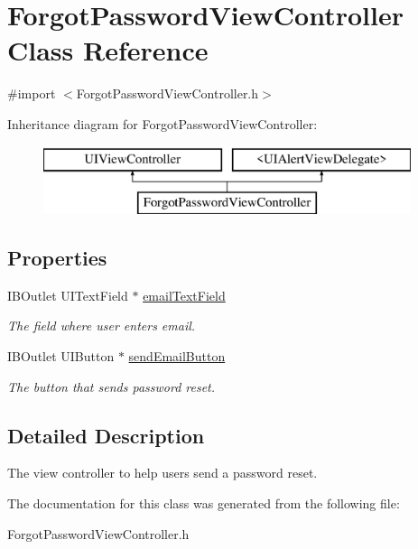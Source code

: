 \hypertarget{interface_forgot_password_view_controller}{\section{Forgot\+Password\+View\+Controller Class Reference}
\label{interface_forgot_password_view_controller}
}


{\ttfamily \#import $<$Forgot\+Password\+View\+Controller.\+h$>$}

Inheritance diagram for Forgot\+Password\+View\+Controller\+:\begin{figure}[H]
\begin{center}
\leavevmode
\includegraphics[height=2.000000cm]{interface_forgot_password_view_controller}
\end{center}
\end{figure}
\subsection*{Properties}
\begin{DoxyCompactItemize}
\item 
\hypertarget{interface_forgot_password_view_controller_a2027b91c7f7d7c18817fb441f41686ef}{I\+B\+Outlet U\+I\+Text\+Field $\ast$ \hyperlink{interface_forgot_password_view_controller_a2027b91c7f7d7c18817fb441f41686ef}{email\+Text\+Field}}\label{interface_forgot_password_view_controller_a2027b91c7f7d7c18817fb441f41686ef}

\begin{DoxyCompactList}\small\item\em The field where user enters email. \end{DoxyCompactList}\item 
\hypertarget{interface_forgot_password_view_controller_a935d59e7247b5f17d578a2c3cc27a318}{I\+B\+Outlet U\+I\+Button $\ast$ \hyperlink{interface_forgot_password_view_controller_a935d59e7247b5f17d578a2c3cc27a318}{send\+Email\+Button}}\label{interface_forgot_password_view_controller_a935d59e7247b5f17d578a2c3cc27a318}

\begin{DoxyCompactList}\small\item\em The button that sends password reset. \end{DoxyCompactList}\end{DoxyCompactItemize}


\subsection{Detailed Description}
The view controller to help users send a password reset. 

The documentation for this class was generated from the following file\+:\begin{DoxyCompactItemize}
\item 
Forgot\+Password\+View\+Controller.\+h\end{DoxyCompactItemize}
